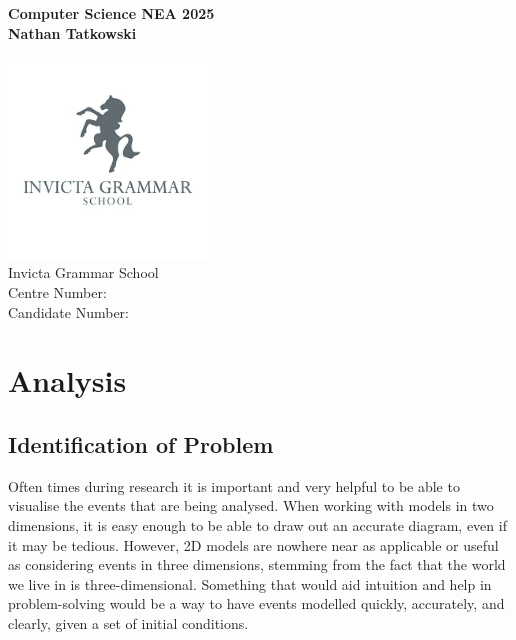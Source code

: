 \documentclass[11pt]{article}
\begin{document}
    \pagestyle{fancy}
    \setlength{\headheight}{13.6pt}

    \begin{titlepage}
        \begin{center}
            \vspace*{1cm}
            \Huge
            \textbf{Computer Science NEA 2025} \\
            \vspace*{2cm}
            \LARGE
            \textbf{Nathan Tatkowski}

            \vfill
            \includegraphics*[width=0.4\textwidth]{figures/igsLogo.jpg} \\
            \Large
            Invicta Grammar School \\
            Centre Number: \\
            Candidate Number: 
        \end{center}
    \end{titlepage}

    \tableofcontents
    \pagebreak


    \section{Analysis}
        \subsection{Identification of Problem}
            Often times during research it is important and very helpful to be able to visualise the events that are being analysed. When working with models in two dimensions, it is easy enough to be able to draw out an accurate diagram, even if it may be tedious. However, 2D models are nowhere near as applicable or useful as considering events in three dimensions, stemming from the fact that the world we live in is three-dimensional. Something that would aid intuition and help in problem-solving would be a way to have events modelled quickly, accurately, and clearly, given a set of initial conditions.
\end{document}
